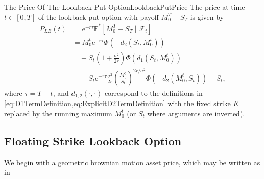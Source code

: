\begin{prop}{The Price Of The Lookback Put Option}{LookbackPutPrice}
	The price at time $t \in [0,T]$ of the lookback put option with payoff $M_0^T - S_T$ is given by
	\begin{align} \label{eq:LookbackPutPrice}
		P_{LB}(t) & = \mathrm{e}^{-r\tau} \mathbb{E}^\ast \left[ M_0^T - S_T \mid \mathcal{F}_t \right] \nonumber                                                             \\
		          & = M_0^t \mathrm{e}^{-r\tau} \Phi \left( -d_2\left(S_t, M_0^t\right) \right) \nonumber                                                                     \\
		          & \quad + S_t \left( 1 + \frac{\sigma^2}{2r} \right) \Phi \left( d_1\left(S_t, M_0^t\right) \right) \nonumber                                               \\
		          & \quad - S_t \mathrm{e}^{-r\tau} \frac{\sigma^2}{2r} \left( \frac{M_0^t}{S_t} \right)^{2r/\sigma^2} \Phi \left( -d_2\left(M_0^t, S_t\right) \right) - S_t,
	\end{align}
	where $\tau = T-t$, and $d_{1,2}(\cdot, \cdot)$ correspond to the definitions in \cref{eq:D1TermDefinition,eq:ExplicitD2TermDefinition} with the fixed strike $K$ replaced by the running maximum $M_0^t$ (or $S_t$ where arguments are inverted).
\end{prop}

\subsection{Floating Strike Lookback Option}

We begin with a geometric brownian motion asset price, which may be written as in
